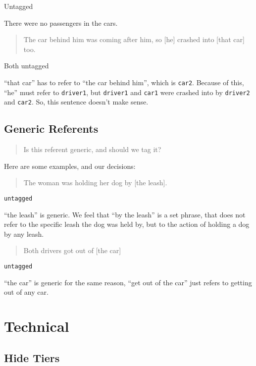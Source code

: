 \documentclass[
]{book}
\begin{document}
Untagged

There were no passengers in the cars.

\begin{quote}
The car behind him was coming after him,
so {[}he{]} crashed into {[}that car{]} too.
\end{quote}

Both untagged

``that car'' has to refer to ``the car behind him'', which is \texttt{car2}.
Because of this, ``he'' must refer to \texttt{driver1},
but \texttt{driver1} and \texttt{car1} were crashed into by \texttt{driver2} and \texttt{car2}.
So, this sentence doesn't make sense.

\hypertarget{generic-referents}{%
\subsection{Generic Referents}\label{generic-referents}}

\begin{quote}
Is this referent generic, and should we tag it?
\end{quote}

Here are some examples, and our decisions:

\begin{quote}
The woman was holding her dog by {[}the leash{]}.
\end{quote}

\texttt{untagged}

``the leash'' is generic.
We feel that ``by the leash'' is a set phrase,
that does not refer to the specific leash the dog was held by,
but to the action of holding a dog by any leash.

\begin{quote}
Both drivers got out of {[}the car{]}
\end{quote}

\texttt{untagged}

``the car'' is generic for the same reason,
``get out of the car'' just refers to getting out of any car.

\hypertarget{technical}{%
\section{Technical}\label{technical}}

\hypertarget{hide-tiers}{%
\subsection{Hide Tiers}\label{hide-tiers}}
\end{document}
